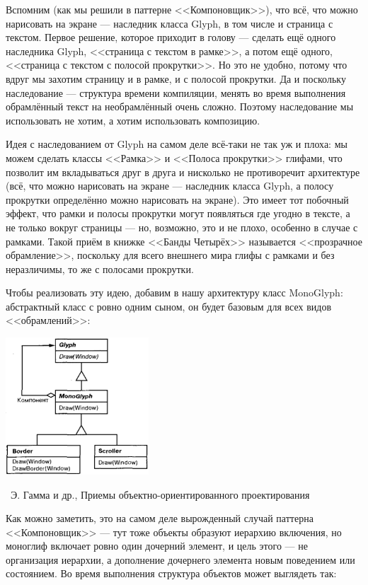 \documentclass[a5paper]{article}
\newcommand{\attribution}[1] {
    \vspace{-5mm}\begin{flushright}\begin{scriptsize}%
    {\textcopyright\, #1}\end{scriptsize}\end{flushright}
}
\begin{document}
Вспомним (как мы решили в паттерне <<Компоновщик>>), что всё, что можно нарисовать на экране --- наследник класса Glyph, в том числе и страница с текстом. Первое решение, которое приходит в голову --- сделать ещё одного наследника Glyph, <<страница с текстом в рамке>>, а потом ещё одного, <<страница с текстом с полосой прокрутки>>. Но это не удобно, потому что вдруг мы захотим страницу и в рамке, и с полосой прокрутки. Да и поскольку наследование --- структура времени компиляции, менять во время выполнения обрамлённый текст на необрамлённый очень сложно. Поэтому наследование мы использовать не хотим, а хотим использовать композицию. 

Идея с наследованием от Glyph на самом деле всё-таки не так уж и плоха: мы можем сделать классы <<Рамка>> и <<Полоса прокрутки>> глифами, что позволит им вкладываться друг в друга и нисколько не противоречит архитектуре (всё, что можно нарисовать на экране --- наследник класса Glyph, а полосу прокрутки определённо можно нарисовать на экране). Это имеет тот побочный эффект, что рамки и полосы прокрутки могут появляться где угодно в тексте, а не только вокруг страницы --- но, возможно, это и не плохо, особенно в случае с рамками. Такой приём в книжке <<Банды Четырёх>> называется <<прозрачное обрамление>>, поскольку для всего внешнего мира глифы с рамками и без неразличимы, то же с полосами прокрутки.

Чтобы реализовать эту идею, добавим в нашу архитектуру класс MonoGlyph: абстрактный класс с ровно одним сыном, он будет базовым для всех видов <<обрамлений>>:

\begin{center}
    \includegraphics[width=0.4\textwidth]{monoglyph.png}
    \attribution{Э. Гамма и др., Приемы объектно-ориентированного проектирования}
\end{center}

Как можно заметить, это на самом деле вырожденный случай паттерна <<Компоновщик>> --- тут тоже объекты образуют иерархию включения, но моноглиф включает ровно один дочерний элемент, и цель этого --- не организация иерархии, а дополнение дочернего элемента новым поведением или состоянием. Во время выполнения структура объектов может выглядеть так:
\end{document}
